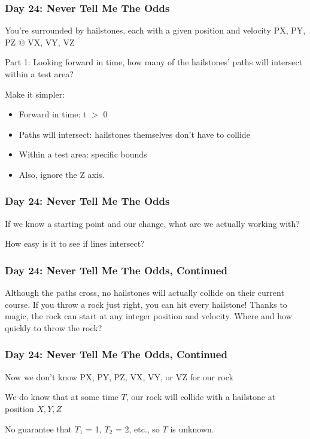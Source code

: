 \begin{frame}
\frametitle{Day 24: Never Tell Me The Odds}

You're surrounded by hailstones, each with a given position and velocity\vfill
PX, PY, PZ @ VX, VY, VZ\vfill

Part 1: Looking forward in time, how many of the hailstones' paths will intersect within a test area?\vfill

Make it simpler:
\begin{itemize}
    \item Forward in time: t $>$ 0
    \item Paths will intersect: hailstones themselves don't have to collide
    \item Within a test area: specific bounds
    \item Also, ignore the Z axis.
\end{itemize}

\end{frame}

\begin{frame}
\frametitle{Day 24: Never Tell Me The Odds}

If we know a starting point and our change, what are we actually working with?\vfill %

How easy is it to see if lines intersect?\vfill %

\end{frame}

\begin{frame}
\frametitle{Day 24: Never Tell Me The Odds, Continued}
    
Although the paths cross, no hailstones will actually collide on their current course. If you throw a rock just right, you can hit every hailstone! \vfill
Thanks to magic, the rock can start at any integer position and velocity. \vfill
Where and how quickly to throw the rock? \vfill
    
\end{frame}

\begin{frame}
\frametitle{Day 24: Never Tell Me The Odds, Continued}
    
Now we don't know PX, PY, PZ, VX, VY, or VZ for our rock\vfill

We do know that at some time $T$, our rock will collide with a hailstone at position $X, Y, Z$\vfill

No guarantee that $T_1$ = 1, $T_2$ = 2, etc., so $T$ is unknown.\vfill
    
\end{frame}

